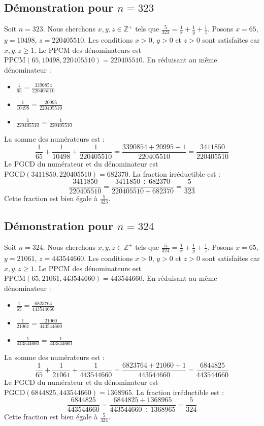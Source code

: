 \documentclass[11pt,a4paper]{article}
\begin{document}
\subsection{Démonstration pour $n = 323$}
Soit $n = 323$. Nous cherchons $x, y, z \in \mathbb{Z}^{+}$ tels que $\frac{5}{323} = \frac{1}{x} + \frac{1}{y} + \frac{1}{z}$.
Posons $x = 65$, $y = 10498$, $z = 220405510$.
Les conditions $x > 0$, $y > 0$ et $z > 0$ sont satisfaites car $x, y, z \geq 1$.
Le PPCM des dénominateurs est $\text{PPCM}(65, 10498, 220405510) = 220405510$.
En réduisant au même dénominateur :
\begin{itemize}
    \item $\frac{1}{65} = \frac{3390854}{220405510}$
    \item $\frac{1}{10498} = \frac{20995}{220405510}$
    \item $\frac{1}{220405510} = \frac{1}{220405510}$
\end{itemize}
La somme des numérateurs est :
$$ \frac{1}{65} + \frac{1}{10498} + \frac{1}{220405510} = \frac{3390854 + 20995 + 1}{220405510} = \frac{3411850}{220405510} $$
Le PGCD du numérateur et du dénominateur est $\text{PGCD}(3411850, 220405510) = 682370$.
La fraction irréductible est :
$$ \frac{3411850}{220405510} = \frac{3411850 \div 682370}{220405510 \div 682370} = \frac{5}{323} $$
Cette fraction est bien égale à $\frac{5}{323}$.

\subsection{Démonstration pour $n = 324$}
Soit $n = 324$. Nous cherchons $x, y, z \in \mathbb{Z}^{+}$ tels que $\frac{5}{324} = \frac{1}{x} + \frac{1}{y} + \frac{1}{z}$.
Posons $x = 65$, $y = 21061$, $z = 443544660$.
Les conditions $x > 0$, $y > 0$ et $z > 0$ sont satisfaites car $x, y, z \geq 1$.
Le PPCM des dénominateurs est $\text{PPCM}(65, 21061, 443544660) = 443544660$.
En réduisant au même dénominateur :
\begin{itemize}
    \item $\frac{1}{65} = \frac{6823764}{443544660}$
    \item $\frac{1}{21061} = \frac{21060}{443544660}$
    \item $\frac{1}{443544660} = \frac{1}{443544660}$
\end{itemize}
La somme des numérateurs est :
$$ \frac{1}{65} + \frac{1}{21061} + \frac{1}{443544660} = \frac{6823764 + 21060 + 1}{443544660} = \frac{6844825}{443544660} $$
Le PGCD du numérateur et du dénominateur est $\text{PGCD}(6844825, 443544660) = 1368965$.
La fraction irréductible est :
$$ \frac{6844825}{443544660} = \frac{6844825 \div 1368965}{443544660 \div 1368965} = \frac{5}{324} $$
Cette fraction est bien égale à $\frac{5}{324}$.
\end{document}
